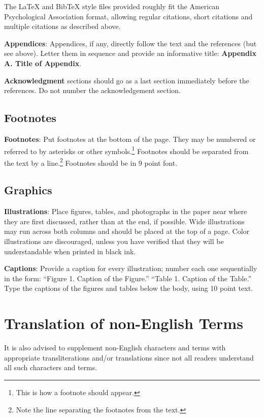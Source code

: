 \documentclass[11pt]{article}
\begin{document}
The \LaTeX{} and Bib\TeX{} style files provided roughly fit the
American Psychological Association format, allowing regular citations,
short citations and multiple citations as described above.

{\bf Appendices}: Appendices, if any, directly follow the text and the
references (but see above).  Letter them in sequence and provide an
informative title: {\bf Appendix A. Title of Appendix}.

\textbf{Acknowledgment} sections should go as a last section immediately
before the references. Do not number the acknowledgement section.

\subsection{Footnotes}

{\bf Footnotes}: Put footnotes at the bottom of the page. They may
be numbered or referred to by asterisks or other
symbols.\footnote{This is how a footnote should appear.} Footnotes
should be separated from the text by a line.\footnote{Note the
line separating the footnotes from the text.}  Footnotes should be in 9 point font.

\subsection{Graphics}

{\bf Illustrations}: Place figures, tables, and photographs in the
paper near where they are first discussed, rather than at the end, if
possible.  Wide illustrations may run across both columns and should be placed at
the top of a page. Color illustrations are discouraged, unless you have verified that
they will be understandable when printed in black ink.

{\bf Captions}: Provide a caption for every illustration; number each one
sequentially in the form:  ``Figure 1. Caption of the Figure.'' ``Table 1.
Caption of the Table.''  Type the captions of the figures and
tables below the body, using 10 point text.

\section{Translation of non-English Terms}

It is also advised to supplement non-English characters and terms
with appropriate transliterations and/or translations
since not all readers understand all such characters and terms.
\end{document}
